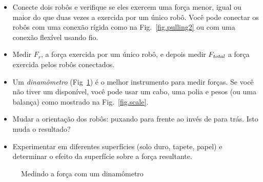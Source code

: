 \begin{framed}
\begin{itemize}
\item Conecte dois robôs e verifique se eles exercem uma força menor, igual ou maior do que duas vezes a exercida por um único robô. Você pode conectar os robôs com uma conexão rígida como na Fig.~\ref{fig.pulling2} ou com uma conexão flexível usando fio.
\item Medir $F_r$, a força exercida por um único robô, e depois medir $F_{\textit{\scriptsize total}}$ a força exercida pelos robôs conectados.
\item Um \emph{dinamômetro} (Fig~\ref{fig.dyna}) é o melhor instrumento para medir forças. Se você não tiver um disponível, você pode usar um cabo, uma polia e pesos (ou uma balança) como mostrado na Fig.~\ref{fig.scale}.
\item Mudar a orientação dos robôs: puxando para frente ao invés de para trás. Isto muda o resultado?
\item Experimentar em diferentes superfícies (solo duro, tapete, papel) e determinar o efeito da superfície sobre a força resultante.
\end{itemize}
\end{framed}

\begin{figure}
\begin{center}
\caption{Medindo a força com um dinamômetro}\label{fig.dyna}
\end{center}
\end{figure}

